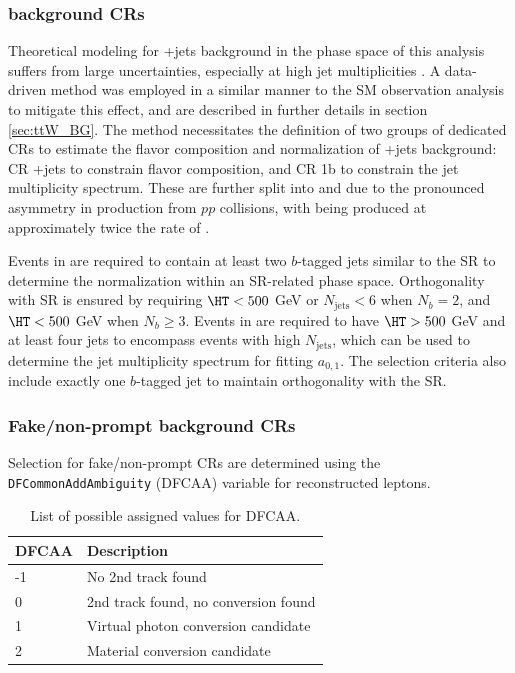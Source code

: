 \documentclass[../thesis.tex]{subfiles}
\begin{document}
\subsubsection*{\ttW background \acs{CR}s}
Theoretical modeling for \ttW+jets background in the phase space of this analysis suffers from large uncertainties, especially at high jet multiplicities \citep{bg:ttH_ttW_ML}.
A data-driven method was employed in a similar manner to the \acs{SM} \tttt observation analysis \citep{tttt_obs} to mitigate this effect, and are described in further details in section \ref{sec:ttW_BG}. The method necessitates the definition of two groups of dedicated \acs{CR}s to estimate the flavor composition and normalization of \ttW+jets background: \acs{CR} \ttW+jets to constrain flavor composition, and \acs{CR} 1b to constrain the jet multiplicity spectrum. These are further split into \CRttWpm and \CRonebpm due to the pronounced asymmetry in \ttW production from $pp$ collisions, with \ttWplus being produced at approximately twice the rate of \ttWminus \citep{ana:ttW_meas}.

Events in \CRttWpm are required to contain at least two $b$-tagged jets similar to the SR to determine the \ttW normalization within an SR-related phase space. Orthogonality with SR is ensured by requiring $\HT<500$ GeV or $N_\mathrm{jets}<6$ when $N_b=2$, and $\HT<500$ GeV when $N_b\geq 3$. Events in \CRonebpm are required to have $\HT>500$ GeV and at least four jets to encompass events with high $N_\mathrm{jets}$, which can be used to determine the \ttW jet multiplicity spectrum for fitting $a_{0,1}$. The selection criteria also include exactly one $b$-tagged jet to maintain orthogonality with the \acs{SR}.

\subsubsection*{Fake/non-prompt background CRs}
Selection for fake/non-prompt \acs{CR}s are determined using the \verb|DFCommonAddAmbiguity| (DFCAA) variable for reconstructed leptons.

\begin{table}[!htbp]
\centering
\caption{\label{tab:ana:DFCAA}List of possible assigned values for DFCAA.}%
\begin{tabular}{p{2cm}|l}
\toprule\toprule
DFCAA & Description \\
\midrule
-1			& No 2nd track found \\
0			& 2nd track found, no conversion found \\
1			& Virtual photon conversion candidate \\
2			& Material conversion candidate\\
\bottomrule\bottomrule
\end{tabular}
\end{table}
\end{document}
